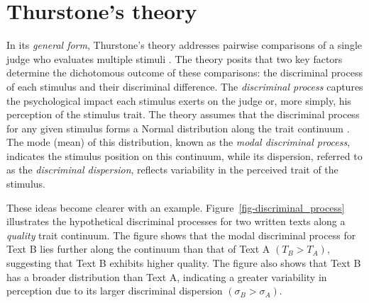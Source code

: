 \documentclass[
  authoryear,
  review,
  1p]{elsarticle}
\begin{document}
\section{Thurstone's theory}\label{sec-thurstone_theory}

In its \emph{general form}, Thurstone's theory addresses pairwise
comparisons of a single judge who evaluates multiple stimuli
\citep{Thurstone_1927a, Thurstone_1927b}. The theory posits that two key
factors determine the dichotomous outcome of these comparisons: the
discriminal process of each stimulus and their discriminal difference.
The \emph{discriminal process} captures the psychological impact each
stimulus exerts on the judge or, more simply, his perception of the
stimulus trait. The theory assumes that the discriminal process for any
given stimulus forms a Normal distribution along the trait continuum
\citep{Thurstone_1927b}. The mode (mean) of this distribution, known as
the \emph{modal discriminal process}, indicates the stimulus position on
this continuum, while its dispersion, referred to as the
\emph{discriminal dispersion}, reflects variability in the perceived
trait of the stimulus.

These ideas become clearer with an example.
Figure~\ref{fig-discriminal_process} illustrates the hypothetical
discriminal processes for two written texts along a \emph{quality} trait
continuum. The figure shows that the modal discriminal process for Text
B lies further along the continuum than that of Text A
\((T_{B} > T_{A})\), suggesting that Text B exhibits higher quality. The
figure also shows that Text B has a broader distribution than Text A,
indicating a greater variability in perception due to its larger
discriminal dispersion \((\sigma_{B} > \sigma_{A})\).
\end{document}
